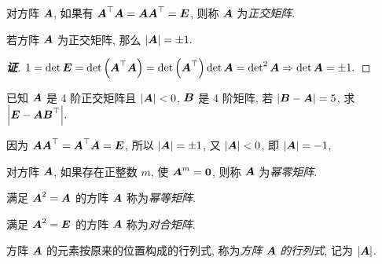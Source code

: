 \begin{definition}[正交矩阵]
    对方阵 $ \vb*{A} $, 如果有 $ \vb*{A}^{\top} \vb*{A}=\vb*{A} \vb*{A}^{\top}=\vb*{E} $, 则称 $ \vb*{A} $ 为\textit{正交矩阵}.
\end{definition}
\begin{theorem}[正交矩阵的行列式]
    若方阵 $ \vb*{A} $ 为正交矩阵, 那么 $|\vb*{A}|=\pm 1.$
\end{theorem}
\begin{proof}[{\songti \textbf{证}}]
    $1=\det\vb*{E}=\det\qty(\vb*{A}^\top\vb*{A})=\det\qty(\vb*{A}^\top)\det\vb*{A}=\det^2\vb*{A}\Rightarrow \det\vb*{A}=\pm 1.$
\end{proof}

\begin{example}
    已知 $\vb*{A}$ 是 4 阶正交矩阵且 $|\vb*{A}|<0$, $\vb*{B}$ 是 4 阶矩阵, 若 $|\vb*{B}-\vb*{A}|=5$, 求 $\qty|\vb*{E}-\vb*{AB}^\top|.$
\end{example}
\begin{solution}
    因为 $\vb*{AA}^\top=\vb*{A}^\top\vb*{A}=\vb*{E}$, 所以 $|\vb*{A}|=\pm 1$, 又 $|\vb*{A}|<0$, 即 $|\vb*{A}|=-1$,
\end{solution}

\begin{definition}[幂零矩阵]
    对方阵 $ \vb*{A} $, 如果存在正整数 $ m $, 使 $ \vb*{A}^{m}=\mathbf{0} $, 则称 $ \vb*{A} $ 为\textit{幂零矩阵}.
\end{definition}

\begin{definition}[幂等矩阵]
    满足 $ \vb*{A}^{2}=\vb*{A} $ 的方阵 $ \vb*{A} $ 称为\textit{幂等矩阵}.
\end{definition}

\begin{definition}[对合矩阵]
    满足 $ \vb*{A}^{2}=\vb*{E} $ 的方阵 $ \vb*{A} $ 称为\textit{对合矩阵}.
\end{definition}

\begin{definition}[方阵的行列式]
    方阵 $ \vb*{A} $ 的元素按原来的位置构成的行列式, 称为\textit{方阵} $ \vb*{A} $ \textit{的行列式}, 记为 $ |\vb*{A}| $.
\end{definition}

